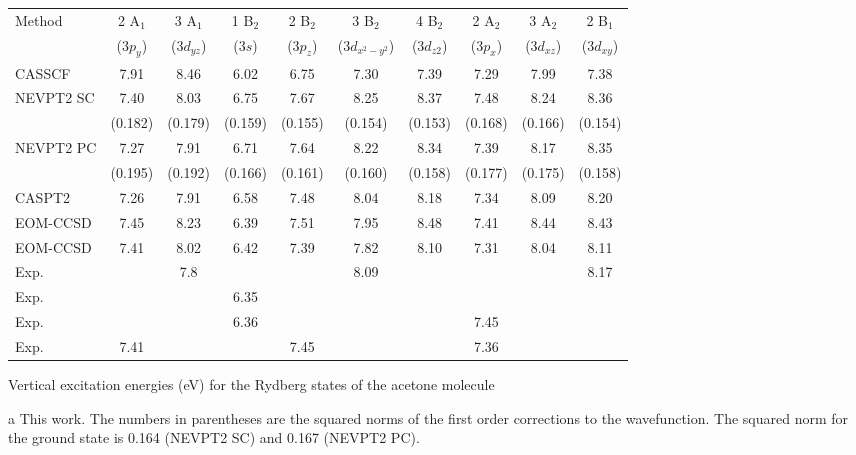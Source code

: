 \begin{center}
\begin{threeparttable}
\tiny
\begin{tabular}{lccccccccc}
\hline
Method &2 A$_1$ & 3 A$_1$ & 1 B$_2$ & 2 B$_2$ & 3 B$_2$ & 4 B$_2$ & 2 A$_2$ & 3 A$_2$ &  2 B$_1$ \\
 &($3p_y$) & ($3d_{yz}$) & ($3s$) & ($3p_z$) & 
($3d_{x^2\!-\!y^2}$) & ($3d_{z2}$) & ($3p_x$) &
($3d_{xz}$) & ($3d_{xy}$)     \\
\hline
CASSCF\tnote{a}  &  7.91  & 8.46  & 6.02  & 6.75  & 7.30  & 7.39  & 7.29  & 7.99  & 7.38  \\
NEVPT2 SC\tnote{a}&  7.40  & 8.03  & 6.75  & 7.67  & 8.25  & 8.37  & 7.48  & 8.24  & 8.36  \\
            & (0.182)&(0.179)&(0.159)&(0.155)&(0.154)&(0.153)&(0.168)&(0.166)&(0.154)\\
NEVPT2 PC\tnote{a}&  7.27  & 7.91  & 6.71  & 7.64  & 8.22  & 8.34  & 7.39  & 8.17  & 8.35  \\
            & (0.195)&(0.192)&(0.166)&(0.161)&(0.160)&(0.158)&(0.177)&(0.175)&(0.158)\\
CASPT2 \cite{jcp-104-1791-1996}
            &  7.26  & 7.91  & 6.58 & 7.48   & 8.04  & 8.18  & 7.34  & 8.09  & 8.20  \\
EOM-CCSD \cite{cpl-241-26-1995}
            &  7.45  & 8.23  & 6.39 & 7.51   & 7.95  & 8.48  & 7.41  & 8.44  & 8.43  \\
EOM-CCSD \cite{jpca-106-4192-2002}
            &  7.41  & 8.02  & 6.42 & 7.39   & 7.82  & 8.10  & 7.31  & 8.04  & 8.11  \\
Exp.\cite{jcp-104-1791-1996}
            &        & 7.8   &      &        & 8.09  &       &       &       & 8.17  \\
Exp.\cite{jcp-98-3795-1993}
            &        &       & 6.35 &        &       &       &       &       &       \\
Exp.\cite{robin-hespm}
            &        &       & 6.36 &        &       &       & 7.45  &       &       \\
Exp.\cite{jcp-89-6086-1988}
            &  7.41  &       &      & 7.45   &       &       & 7.36  &       &       \\
\hline
\end{tabular}
\caption{\footnotesize Vertical excitation energies (eV) for the Rydberg states of
the acetone molecule}
\label{tbl:aceto_exc_ryd}
\begin{tablenotes}
\footnotesize
\item[a] This work. The numbers in parentheses are the squared norms of the
first order corrections to the wavefunction. The squared norm for the
ground state is 0.164 (NEVPT2 SC) and 0.167 (NEVPT2 PC).
\end{tablenotes}
\end{threeparttable}
\end{center}

